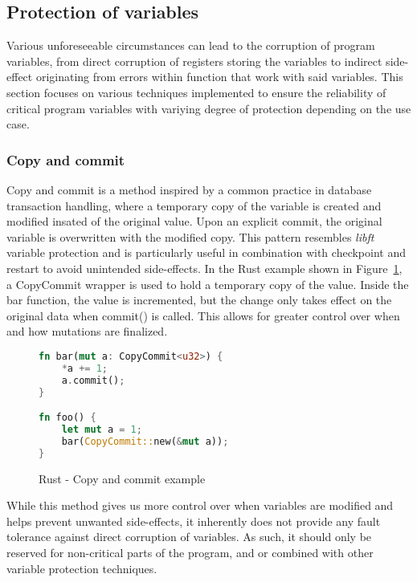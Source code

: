 \subsection{Protection of variables} \label{sec:var_protection}

Various unforeseeable circumstances can lead to the corruption of program variables, from direct corruption of registers storing the variables to indirect side-effect originating from errors within function that work with said variables. This section focuses on various techniques implemented to ensure the reliability of critical program variables with variying degree of protection depending on the use case.

\subsubsection{Copy and commit}

Copy and commit is a method inspired by a common practice in database transaction handling, where a temporary copy of the variable is created and modified insated of the original value. Upon an explicit commit, the original variable is overwritten with the modified copy. This pattern resembles \textit{libft} \cite{libft} variable protection and is particularly useful in combination with checkpoint and restart to avoid unintended side-effects. In the Rust example shown in Figure~\ref{fig:rust_copy_commit}, a CopyCommit wrapper is used to hold a temporary copy of the value. Inside the bar function, the value is incremented, but the change only takes effect on the original data when commit() is called. This allows for greater control over when and how mutations are finalized.

\begin{figure}[!h]
\begin{lstlisting}[language=Rust]
fn bar(mut a: CopyCommit<u32>) {
    *a += 1;
    a.commit();
}

fn foo() {
    let mut a = 1;
    bar(CopyCommit::new(&mut a));
}
\end{lstlisting}
\caption{Rust - Copy and commit example}
\label{fig:rust_copy_commit}
\end{figure}

While this method gives us more control over when variables are modified and helps prevent unwanted side-effects, it inherently does not provide any fault tolerance against direct corruption of variables. As such, it should only be reserved for non-critical parts of the program, and or combined with other variable protection techniques.

